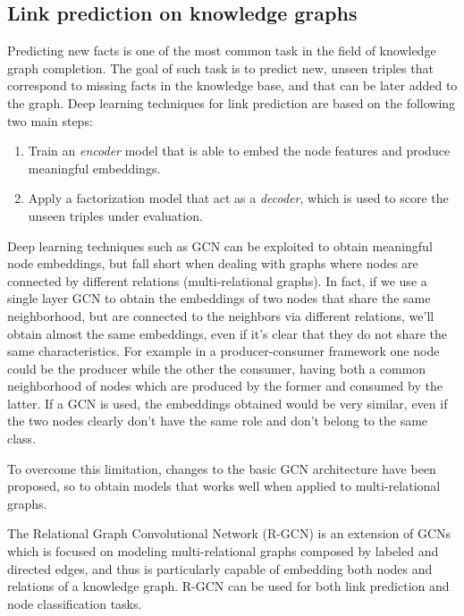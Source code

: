 \documentclass[%
    corpo=13.5pt,
    twoside,
    oldstyle,
    tipotesi=magistrale,
    greek,
    evenboxes
]{toptesi}
\begin{document}
\subsection{Link prediction on knowledge graphs}
\label{subsec:linkprediction}

Predicting new facts is one of the most common task in the field
of knowledge graph completion. The goal of such task is to predict new, unseen
triples that correspond to missing facts in the knowledge base, and that can be
later added to the graph.
Deep learning techniques for link prediction are based on the following two
main steps:

\begin{enumerate}
    \item Train an \emph{encoder} model
    that is able to embed the node features and produce meaningful embeddings.
    \item Apply a factorization model that act as a \emph{decoder}, which is
    used to score the unseen triples under evaluation.
\end{enumerate}

Deep learning techniques such as GCN can be exploited to obtain meaningful
node embeddings, but fall short when dealing with graphs where
nodes are connected by different relations (multi-relational graphs).
In fact, if we use a single layer GCN to obtain the embeddings of two nodes
that share the same neighborhood, but are connected to the neighbors via
different relations, we'll obtain almost the same embeddings, even if it's
clear that they do not share the same characteristics. For example in a
producer-consumer framework one node could be the producer while the other
the consumer, having both a common neighborhood of nodes
which are produced by the former and consumed by the latter.
If a GCN is used, the embeddings obtained would be very similar, even if
the two nodes clearly don't have the same role and don't belong to the
same class.

To overcome this limitation, changes to the basic GCN architecture have been
proposed, so to obtain models that works well when applied to multi-relational
graphs.
\newline

The Relational Graph Convolutional Network \cite{schlichtkrull2018} (R-GCN) is an
extension of GCNs which is focused on modeling multi-relational graphs composed
by labeled and directed edges, and thus is particularly capable of embedding
both nodes and relations of a knowledge graph.
R-GCN can be used for both link prediction and node classification tasks.
\end{document}
